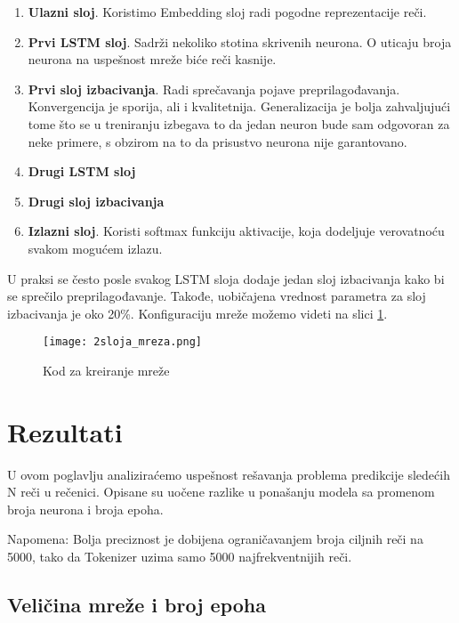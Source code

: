 \documentclass[a4paper]{article}
\begin{document}
\begin{enumerate}
    \item \textbf{Ulazni sloj}. Koristimo Embedding sloj radi pogodne reprezentacije reči. 
    \item \textbf{Prvi LSTM sloj}. Sadrži nekoliko stotina skrivenih neurona. O uticaju broja neurona na uspešnost mreže biće reči kasnije.
    \item \textbf{Prvi sloj izbacivanja}. Radi sprečavanja pojave preprilagođavanja. Konvergencija je sporija, ali i kvalitetnija. Generalizacija je bolja zahvaljujući tome što se u treniranju izbegava to da jedan neuron bude sam odgovoran za neke primere, s obzirom na to da prisustvo neurona nije garantovano.
    \item \textbf{Drugi LSTM sloj}
    \item \textbf{Drugi sloj izbacivanja}
    \item \textbf{Izlazni sloj}. Koristi softmax funkciju aktivacije, koja dodeljuje verovatnoću svakom mogućem izlazu. 
\end{enumerate}

U praksi se često posle svakog LSTM sloja dodaje jedan sloj izbacivanja kako bi se sprečilo preprilagođavanje. Takođe,
uobičajena vrednost parametra za sloj izbacivanja je oko 20\%. Konfiguraciju mreže možemo videti na slici \ref{fig:mreža}.

\begin{figure}[htp]
    \centering
    \texttt{[image: 2sloja\_mreza.png]}
    \caption{Kod za kreiranje mreže}
    \label{fig:mreža}
\end{figure}



\section{Rezultati}

U ovom poglavlju analiziraćemo uspešnost rešavanja problema predikcije sledećih N reči u rečenici. Opisane su uočene razlike u ponašanju modela sa promenom broja neurona i broja epoha. 

Napomena: Bolja preciznost je dobijena ograničavanjem broja ciljnih reči na 5000, tako da Tokenizer uzima samo 5000 najfrekventnijih reči.

\subsection{Veličina mreže i broj epoha}
\end{document}
